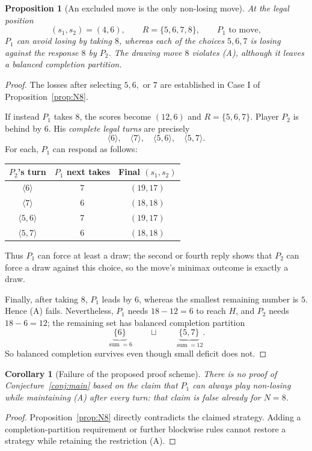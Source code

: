 \documentclass[11pt,a4paper]{article}
\newtheorem{proposition}[theorem]{Proposition}
\newtheorem{corollary}[theorem]{Corollary}
\theoremstyle{definition}
\theoremstyle{remark}
\newcommand{\sm}{\operatorname{sum}}
\begin{document}
\begin{proposition}[An excluded move is the only non-losing move]
\label{prop:drawing8}
At the legal position
\begin{equation}\label{eq:critical}
\boxed{(s_1,s_2)=(4,6),\qquad R=\{5,6,7,8\},
\qquad P_1\text{ to move},}
\end{equation}
$P_1$ can avoid losing by taking $8$, whereas each of the choices
$5,6,7$ is losing against the response $8$ by $P_2$.
The drawing move $8$ violates (A), although it leaves a balanced
completion partition.
\end{proposition}
\begin{proof}
The losses after selecting $5,6,$ or $7$ are established in
Case I of Proposition~\ref{prop:N8}.

If instead $P_1$ takes $8$, the scores become $(12,6)$ and
$R=\{5,6,7\}$.  Player $P_2$ is behind by $6$.
His \emph{complete legal turns} are precisely
\[
\langle6\rangle,\quad\langle7\rangle,\quad
\langle5,6\rangle,\quad\langle5,7\rangle.
\]
For each, $P_1$ can respond as follows:
\begin{center}
\begin{tabular}{@{}ccc@{}}
\toprule
$P_2$'s turn & $P_1$ next takes & Final $(s_1,s_2)$\\
\midrule
$\langle6\rangle$ & $7$ & $(19,17)$\\
$\langle7\rangle$ & $6$ & $(18,18)$\\
$\langle5,6\rangle$ & $7$ & $(19,17)$\\
$\langle5,7\rangle$ & $6$ & $(18,18)$\\
\bottomrule
\end{tabular}
\end{center}
Thus $P_1$ can force at least a draw; the second or fourth reply
shows that $P_2$ can force a draw against this choice, so the move's
minimax outcome is exactly a draw.

Finally, after taking $8$, $P_1$ leads by $6$, whereas the
smallest remaining number is $5$.  Hence (A) fails.  Nevertheless,
$P_1$ needs $18-12=6$ to reach $H$, and $P_2$ needs $18-6=12$;
the remaining set has balanced completion partition
\[
\underbrace{\{6\}}_{\sm=6}
\qquad\sqcup\qquad
\underbrace{\{5,7\}}_{\sm=12}.
\]
So balanced completion survives even though small deficit does not.
\end{proof}

\begin{corollary}[Failure of the proposed proof scheme]
\label{cor:failure}
There is no proof of Conjecture~\ref{conj:main} based on the claim
that $P_1$ can always play non-losing while maintaining (A) after
every turn: that claim is false already for $N=8$.
\end{corollary}
\begin{proof}
Proposition~\ref{prop:N8} directly contradicts the claimed
strategy.  Adding a completion-partition requirement or further
blockwise rules cannot restore a strategy while retaining the
restriction (A).
\end{proof}
\end{document}
